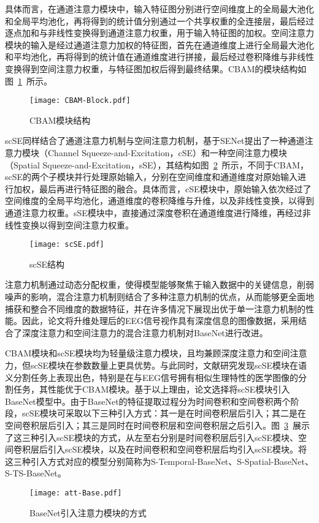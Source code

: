 具体而言，在通道注意力模块中，输入特征图分别进行空间维度上的全局最大池化和全局平均池化，再将得到的统计值分别通过一个共享权重的全连接层，最后经过逐点加和与非线性变换得到通道注意力权重，用于输入特征图的加权。空间注意力模块的输入是经过通道注意力加权的特征图，首先在通道维度上进行全局最大池化和平均池化，再将得到的统计值在通道维度进行拼接，最后经过卷积降维与非线性变换得到空间注意力权重，与特征图加权后得到最终结果。CBAM的模块结构如图~\ref{fig:CBAM-Block}~所示。
\begin{figure}
  \centering
  \texttt{[image: CBAM-Block.pdf]}
  \caption{CBAM模块结构}
  \label{fig:CBAM-Block}
\end{figure}

scSE同样结合了通道注意力机制与空间注意力机制，基于SENet提出了一种通道注意力模块（Channel Squeeze-and-Excitation，cSE）和一种空间注意力模块（Spatial Squeeze-and-Excitation，sSE），其结构如图~\ref{fig:scSE}~所示，不同于CBAM，scSE的两个子模块并行处理原始输入，分别在空间维度和通道维度对原始输入进行加权，最后再进行特征图的融合。具体而言，cSE模块中，原始输入依次经过了空间维度的全局平均池化，通道维度的卷积降维与升维，以及非线性变换，以得到通道注意力权重。sSE模块中，直接通过深度卷积在通道维度进行降维，再经过非线性变换以得到空间注意力权重。
\begin{figure}
    \centering
    \texttt{[image: scSE.pdf]}
    \caption{scSE结构}
    \label{fig:scSE}
\end{figure}

注意力机制通过动态分配权重，使得模型能够聚焦于输入数据中的关键信息，削弱噪声的影响，混合注意力机制则结合了多种注意力机制的优点，从而能够更全面地捕获和整合不同维度的数据特征，并在许多情况下展现出优于单一注意力机制的性能。因此，论文将升维处理后的EEG信号视作具有深度信息的图像数据，采用结合了深度注意力和空间注意力的混合注意力机制对BaseNet进行改进。

CBAM模块和scSE模块均为轻量级注意力模块，且均兼顾深度注意力和空间注意力，但scSE模块在参数数量上更具优势。与此同时，文献\cite{roy2018concurrent}研究发现scSE模块在语义分割任务上表现出色，特别是在与EEG信号拥有相似生理特性的医学图像的分割任务，其性能优于CBAM模块。基于以上理由，论文选择将scSE模块引入BaseNet模型中。由于BaseNet的特征提取过程分为时间卷积和空间卷积两个阶段，scSE模块可采取以下三种引入方式：其一是在时间卷积层后引入；其二是在空间卷积层后引入；其三是同时在时间卷积层和空间卷积层之后引入。图~\ref{fig:att-Base}~展示了这三种引入scSE模块的方式，从左至右分别是时间卷积层后引入scSE模块、空间卷积层后引入scSE模块，以及在时间卷积和空间卷积层后均引入scSE模块。将这三种引入方式对应的模型分别简称为S-Temporal-BaseNet、S-Spatial-BaseNet、S-TS-BaseNet。
\begin{figure}
  \centering
  \texttt{[image: att-Base.pdf]}
  \caption{BaseNet引入注意力模块的方式}
  \label{fig:att-Base}
\end{figure}


